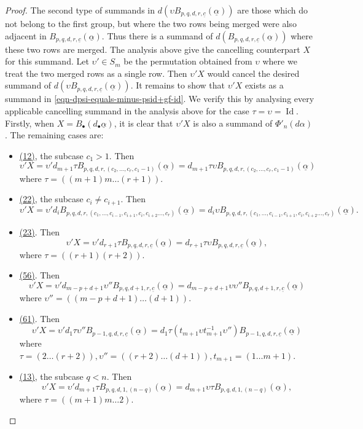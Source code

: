 \documentclass[10pt,a4paper]{amsart}
\DeclareMathOperator{\id}{Id}
\begin{document}
\begin{proof}
The second type of summands in 
$d \left(\upsilon B_{p,q,d,r,\underline{c}}(\underline{\alpha})\right)$
are those which do not belong to the first group, but
where the two rows being merged were also adjacent in 
$B_{p,q,d,r,\underline{c}}(\underline{\alpha})$. 
Thus there is a summand of 
$d(B_{p,q,d,r,\underline{c}}(\underline{\alpha}))$ 
where these two rows are merged.  
The analysis above give the cancelling counterpart $X$ for this summand. 
Let $\upsilon' \in S_m$ be the permutation obtained from $\upsilon$
where we treat the two merged rows as a single row. 
Then $\upsilon' X$ would cancel the desired summand of 
$d \left(\upsilon B_{p,q,d,r,\underline{c}}(\underline{\alpha})\right)$. 
It remains to show that $\upsilon'X$ exists as a summand in  
\eqref{eqn-dpsi-equals-minus-psid+gf-id}. We verify this
by analysing every applicable cancelling summand in the analysis
above for the case $\tau = \upsilon = \id$. Firstly, when 
$X = B_\bullet(d_\bullet \underline{\alpha})$, it is clear 
that $\upsilon' X$ is also a summand of $\Phi'_n(d \alpha)$. 
The remaining cases are:
\begin{itemize}
\item \underline{(12)}, the subcase $c_1 > 1$. Then 
$$ \upsilon' X = \upsilon' 
d_{m+1} \tau B_{p, q, d, r, (c_2, \dots, c_r, c_1 - 1)}(\underline{\alpha})
= 
d_{m+1} \tau \upsilon 
B_{p, q, d, r, (c_2, \dots, c_r, c_1 - 1)}(\underline{\alpha})
$$
where $\tau = \left((m+1)m\dots(r+1)\right)$.
\item \underline{(22)}, the subcase $c_i \neq c_{i+1}$. Then 
$$
\upsilon' X = \upsilon' 
d_{i} B_{p, q, d, r,(c_1, \dots, c_{i-1},
c_{i+1}, c_{i}, c_{i+2} \dots, c_r)} (\underline{\alpha})
= 
d_{i} \upsilon B_{p, q, d, r,(c_1, \dots, c_{i-1},
c_{i+1}, c_{i}, c_{i+2} \dots, c_r)} (\underline{\alpha}).$$ 
\item \underline{(23)}. Then 
$$ \upsilon' X = 
\upsilon' d_{r+1} \tau B_{p, q, d, r,\underline{c}}(\underline{\alpha})
= 
d_{r+1} \tau \upsilon B_{p, q, d,
r,\underline{c}}(\underline{\alpha}), $$
where $\tau = \left((r+1)(r+2)\right)$. 
\item \underline{(56)}. Then 
$$ \upsilon' X = 
\upsilon' d_{m-p+d+1} \upsilon'' B_{p, q, d+1, r, \underline{c}}
(\underline{\alpha})
= d_{m-p+d+1} \upsilon \upsilon'' B_{p, q, d+1, r, \underline{c}}
(\underline{\alpha}) $$
where $\upsilon'' = \left((m-p+d+1)\dots(d+1)\right).$
\item \underline{(61)}. Then
$$ \upsilon' X = 
\upsilon' d_1 \tau \upsilon'' B_{p-1, q, d, r, \underline{c}} (\underline{\alpha})
=
d_1 \tau (t_{m+1} \upsilon t_{m+1}^{-1} \upsilon'')  B_{p-1, q, d, r, \underline{c}} (\underline{\alpha})
$$
where $\tau = \left(2\dots(r+2)\right), 
\upsilon'' = \left((r+2)\dots(d+1)\right), t_{m+1} = (1\dots{m+1}).$
\item \underline{(13)}, the subcase $q < n$.
Then 
$$ \upsilon' X =
\upsilon'
d_{m+1} \tau B_{p, q, d, 1, (n-q)}(\underline{\alpha})
= d_{m+1} \upsilon \tau B_{p, q, d, 1, (n-q)}(\underline{\alpha}), $$
where $\tau = \left((m+1)m\dots2\right)$.


\end{itemize}
\end{proof}
\end{document}
